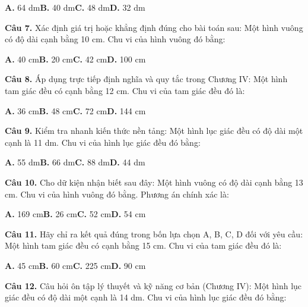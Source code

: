 \documentclass[11pt,a4paper]{article}
\begin{document}
\hspace*{1.5em}\textbf{A.} 64 dm\quad\quad \textbf{B.} 40 dm\quad\quad \textbf{C.} 48 dm\quad\quad \textbf{D.} 32 dm\par\vspace{2pt}
\textbf{\color{primary} Câu 7.} Xác định giá trị hoặc khẳng định đúng cho bài toán sau: Một hình vuông có độ dài cạnh bằng 10 cm. Chu vi của hình vuông đó bằng:\par
\hspace*{1.5em}\textbf{A.} 40 cm\quad\quad \textbf{B.} 20 cm\quad\quad \textbf{C.} 42 cm\quad\quad \textbf{D.} 100 cm\par\vspace{2pt}
\textbf{\color{primary} Câu 8.} Áp dụng trực tiếp định nghĩa và quy tắc trong Chương IV: Một hình tam giác đều có cạnh bằng 12 cm. Chu vi của tam giác đều đó là:\par
\hspace*{1.5em}\textbf{A.} 36 cm\quad\quad \textbf{B.} 48 cm\quad\quad \textbf{C.} 72 cm\quad\quad \textbf{D.} 144 cm\par\vspace{2pt}
\textbf{\color{primary} Câu 9.} Kiểm tra nhanh kiến thức nền tảng: Một hình lục giác đều có độ dài một cạnh là 11 dm. Chu vi của hình lục giác đều đó bằng:\par
\hspace*{1.5em}\textbf{A.} 55 dm\quad\quad \textbf{B.} 66 dm\quad\quad \textbf{C.} 88 dm\quad\quad \textbf{D.} 44 dm\par\vspace{2pt}
\textbf{\color{primary} Câu 10.} Cho dữ kiện nhận biết sau đây: Một hình vuông có độ dài cạnh bằng 13 cm. Chu vi của hình vuông đó bằng. Phương án chính xác là:\par
\hspace*{1.5em}\textbf{A.} 169 cm\quad\quad \textbf{B.} 26 cm\quad\quad \textbf{C.} 52 cm\quad\quad \textbf{D.} 54 cm\par\vspace{2pt}
\textbf{\color{primary} Câu 11.} Hãy chỉ ra kết quả đúng trong bốn lựa chọn A, B, C, D đối với yêu cầu: Một hình tam giác đều có cạnh bằng 15 cm. Chu vi của tam giác đều đó là:\par
\hspace*{1.5em}\textbf{A.} 45 cm\quad\quad \textbf{B.} 60 cm\quad\quad \textbf{C.} 225 cm\quad\quad \textbf{D.} 90 cm\par\vspace{2pt}
\textbf{\color{primary} Câu 12.} Câu hỏi ôn tập lý thuyết và kỹ năng cơ bản (Chương IV): Một hình lục giác đều có độ dài một cạnh là 14 dm. Chu vi của hình lục giác đều đó bằng:\par
\end{document}
